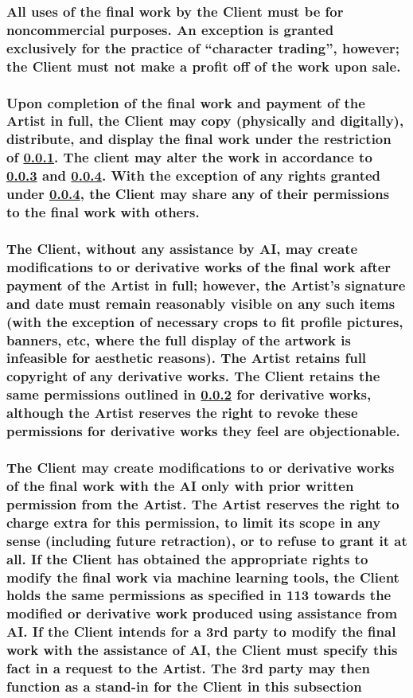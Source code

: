 \documentclass{article}
\begin{document}
\begin{flushleft}
		\subsubsection[Commercial Use Restriction]{\normalfont All uses of the final work by the Client must be for noncommercial purposes. An exception is granted exclusively for the practice of ``character trading'', however; the Client must not make a profit off of the work upon sale.}\label{clientnoncommercial}
		\hphantom{owo}

		\subsubsection[Client Limited Copyright]{\normalfont Upon completion of the final work and payment of the Artist in full, the Client may copy (physically and digitally), distribute, and display the final work under the restriction of \ref{clientnoncommercial}. The client may alter the work in accordance to \ref{clientderivative} and  \ref{clientai}. With the exception of any rights granted under \ref{clientai}, the Client may share any of their permissions to the final work with others.}\label{clientperms}

		\subsubsection[Derivative Works]{\normalfont The Client, without any assistance by AI, may create modifications to or derivative works of the final work after payment of the Artist in full; however, the Artist's signature and date must remain reasonably visible on any such items (with the exception of necessary crops to fit profile pictures, banners, etc, where the full display of the artwork is infeasible for aesthetic reasons). The Artist retains full copyright of any derivative works. The Client retains the same permissions outlined in \ref{clientperms} for derivative works, although the Artist reserves the right to revoke these permissions for derivative works they feel are objectionable.}\label{clientderivative}

		\subsubsection[Client AI Policy]{\normalfont The Client may create modifications to or derivative works of the final work with the AI only with prior written permission from the Artist. The Artist reserves the right to charge extra for this permission, to limit its scope in any sense (including future retraction), or to refuse to grant it at all. If the Client has obtained the appropriate rights to modify the final work via machine learning tools, the Client holds the same permissions as specified in 113 towards the modified or derivative work produced using assistance from AI. If the Client intends for a 3rd party to modify the final work with the assistance of AI, the Client must specify this fact in a request to the Artist. The 3rd party may then function as a stand-in for the Client in this subsection}\label{clientai}\hphantom{owo}


\end{flushleft}
\end{document}
